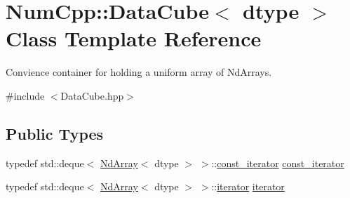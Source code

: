 \hypertarget{class_num_cpp_1_1_data_cube}{}\section{Num\+Cpp\+:\+:Data\+Cube$<$ dtype $>$ Class Template Reference}
\label{class_num_cpp_1_1_data_cube}


Convience container for holding a uniform array of Nd\+Arrays.  




{\ttfamily \#include $<$Data\+Cube.\+hpp$>$}

\subsection*{Public Types}
\begin{DoxyCompactItemize}
\item 
typedef std\+::deque$<$ \mbox{\hyperlink{class_num_cpp_1_1_nd_array}{Nd\+Array}}$<$ dtype $>$ $>$\+::\mbox{\hyperlink{class_num_cpp_1_1_data_cube_a5916086d9b71149eaa35651e2212de39}{const\+\_\+iterator}} \mbox{\hyperlink{class_num_cpp_1_1_data_cube_a5916086d9b71149eaa35651e2212de39}{const\+\_\+iterator}}
\item 
typedef std\+::deque$<$ \mbox{\hyperlink{class_num_cpp_1_1_nd_array}{Nd\+Array}}$<$ dtype $>$ $>$\+::\mbox{\hyperlink{class_num_cpp_1_1_data_cube_a817f739957d3d426e8a19a66867674ba}{iterator}} \mbox{\hyperlink{class_num_cpp_1_1_data_cube_a817f739957d3d426e8a19a66867674ba}{iterator}}
\end{DoxyCompactItemize}
